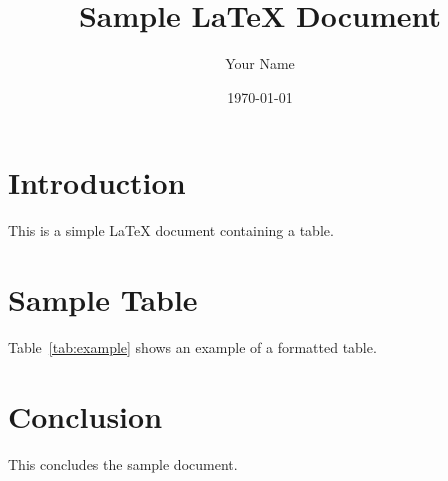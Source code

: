 \documentclass[12pt]{article}
\begin{document}
\title{Sample LaTeX Document}
\author{Your Name}
\date{\today}
\maketitle

\section{Introduction}
This is a simple LaTeX document containing a table.

\section{Sample Table}
Table~\ref{tab:example} shows an example of a formatted table.

\begin{table}[h]
    \centering
    \caption{Example Table}
    \label{tab:example}
    
\end{table}

\section{Conclusion}
This concludes the sample document.
\end{document}
